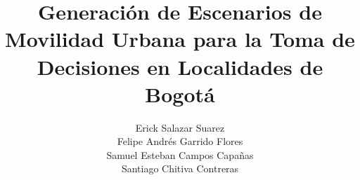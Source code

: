 \documentclass{article}
\title{Generación de Escenarios de Movilidad Urbana para la Toma de Decisiones en Localidades de Bogotá}
\author{
\begin{tabular}{c}
    Erick Salazar Suarez \\ 
    Felipe Andrés Garrido Flores \\ 
    Samuel Esteban Campos Capañas \\ 
    Santiago Chitiva Contreras
\end{tabular}
}
\begin{document}
    \renewcommand{\contentsname}{TABLA DE CONTENIDO}
    \renewcommand{\listfigurename}{LISTA DE FIGURAS}
    \renewcommand{\listtablename}{LISTA DE TABLAS}
    \def\tablename{Tabla}
    
    

    
    
    
    
    
    \tableofcontents
    \newpage
    \listoffigures
    \newpage
    \listoftables

    
    
    
    
    
    
    
    
    
    
    
    
\end{document}
